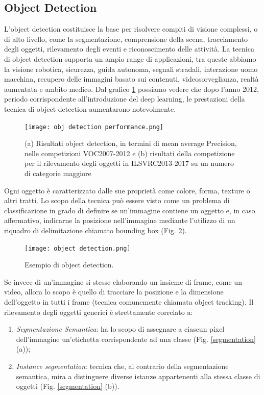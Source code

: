 \subsection{Object Detection}\label{OBJD}
L'object detection costituisce la base per risolvere compiti di visione complessi, 
o di alto livello, come la segmentazione, comprensione della scena, 
tracciamento degli oggetti, rilevamento degli eventi e riconoscimento delle 
attività. La tecnica di object detection supporta un ampio range di applicazioni, 
tra queste abbiamo la visione robotica, sicurezza, guida autonoma, 
segnali stradali, interazione uomo macchina, recupero delle immagini basato 
sui contenuti, videosorveglianza, realtà aumentata e ambito medico. Dal 
grafico \ref{obj det performance} possiamo vedere che dopo l'anno 2012, periodo corrispondente 
all'introduzione del deep learning, le prestazioni della tecnica di object detection 
aumentarono notevolmente.
\begin{figure}
    \centering
    \texttt{[image: obj detection performance.png]}
    \centering
    \caption{(a) Risultati object detection, in termini di mean average Precision, nelle competizioni VOC2007-2012 e (b) risultati della competizione per il rilevamento degli oggetti in ILSVRC2013-2017 su un numero di categorie maggiore}
    \label{obj det performance}
\end{figure}
Ogni oggetto è caratterizzato dalle sue 
proprietà come colore, forma, texture o altri tratti. Lo scopo della tecnica 
può essere visto come un problema di classificazione in grado di definire 
se un'immagine contiene un oggetto e, in caso affermativo, indicarne la 
posizione nell'immagine mediante l'utilizzo di un riquadro di delimitazione 
chiamato bounding box (Fig. \ref{object detection}). 
\begin{figure}
    \centering
    \texttt{[image: object detection.png]}
    \centering
    \caption{Esempio di object detection.}
    \label{object detection}
\end{figure}
Se invece di un'immagine si stesse 
elaborando un insieme di frame, come un video, allora lo scopo è quello 
di tracciare la posizione e la dimensione dell'oggetto in tutti i frame (tecnica 
comunemente chiamata object tracking). Il rilevamento degli oggetti 
generici è strettamente correlato a:
\begin{enumerate}
    \item \emph{Segmentazione Semantica}: ha lo scopo di assegnare a ciascun pixel 
    dell'immagine un'etichetta corrispondente ad una classe (Fig. \ref{segmentation} 
    (a));
    \item \emph{Instance segmentation}: tecnica che, al contrario della segmentazione 
    semantica, mira a distinguere diverse istanze appartenenti alla stessa 
    classe di oggetti (Fig. \ref{segmentation} (b)).
\end{enumerate}
